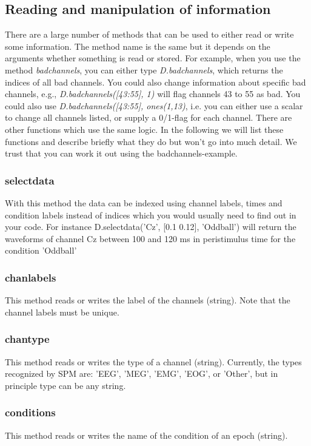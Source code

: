 \subsection{Reading and manipulation of information}
There are a large number of methods that can be used to either read or
write some information. The method name is the same but it depends on
the arguments whether something is read or stored. For example, when
you use the method \textit{badchannels}, you can either type
\textit{D.badchannels}, which returns the indices of all bad channels. You
could also change information about specific bad channels, e.g.,
\textit{D.badchannels([43:55], 1)} will flag channels 43 to 55 as
bad. You 
  could also use \textit{D.badchannels([43:55], ones(1,13)}, i.e. you
  can 
  either use a scalar to change all channels listed, or supply a
  0/1-flag for each channel. There are other functions which use the
  same logic. In the following we will list these functions and
  describe briefly what they do but won't go into much detail. We
  trust that you can work it out using the badchannels-example. 

\subsubsection{selectdata}
With this method the data can be indexed using channel labels, times and
condition labels instead of indices which you would usually need to find out
in your code. For instance D.selectdata('Cz', [0.1 0.12], 'Oddball') will return
the waveforms of channel Cz between 100 and 120 ms in peristimulus time for the
condition 'Oddball'

\subsubsection{chanlabels}
This method reads or writes the label of the channels (string).  Note that
the channel labels must be unique.

\subsubsection{chantype}
This method reads or writes the type of a channel (string). Currently,
the types recognized by SPM are: 'EEG', 'MEG', 'EMG', 'EOG', or
'Other', but in principle type can be any string.

\subsubsection{conditions}
This method  reads or writes the name of the condition of an epoch
(string). 

